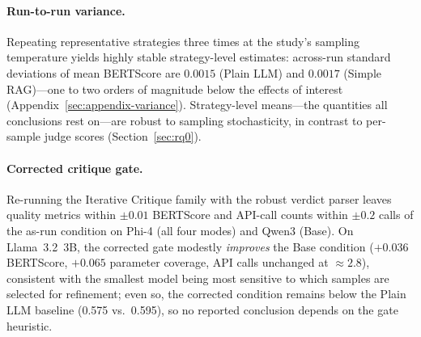 \documentclass[pdflatex,sn-mathphys-ay]{sn-jnl}%
\theoremstyle{thmstyleone}%
\theoremstyle{thmstyletwo}%
\theoremstyle{thmstylethree}%
\begin{document}
{\paragraph{Run-to-run variance.} Repeating representative strategies three times at the study's sampling temperature yields highly stable strategy-level estimates: across-run standard deviations of mean BERTScore are $0.0015$ (Plain LLM) and $0.0017$ (Simple RAG)---one to two orders of magnitude below the effects of interest (Appendix~\ref{sec:appendix-variance}). Strategy-level means---the quantities all conclusions rest on---are robust to sampling stochasticity, in contrast to per-sample judge scores (Section~\ref{sec:rq0}).
\paragraph{Corrected critique gate.} Re-running the Iterative Critique family with the robust verdict parser leaves quality metrics within $\pm 0.01$ BERTScore and API-call counts within $\pm 0.2$ calls of the as-run condition on Phi-4 (all four modes) and Qwen3 (Base). On Llama~3.2~3B, the corrected gate modestly \emph{improves} the Base condition ($+0.036$ BERTScore, $+0.065$ parameter coverage, API calls unchanged at ${\approx}2.8$), consistent with the smallest model being most sensitive to which samples are selected for refinement; even so, the corrected condition remains below the Plain LLM baseline (0.575 vs.\ 0.595), so no reported conclusion depends on the gate heuristic.



}
\end{document}
